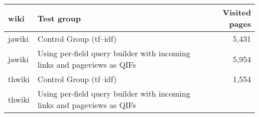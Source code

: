 \documentclass[12pt,]{article}
\begin{document}
\begin{longtable}[]{@{}llr@{}}
\toprule
\begin{minipage}[b]{0.10\columnwidth}\raggedright\strut
wiki\strut
\end{minipage} & \begin{minipage}[b]{0.67\columnwidth}\raggedright\strut
Test group\strut
\end{minipage} & \begin{minipage}[b]{0.14\columnwidth}\raggedleft\strut
Visited pages\strut
\end{minipage}\tabularnewline
\midrule
\endhead
\begin{minipage}[t]{0.10\columnwidth}\raggedright\strut
jawiki\strut
\end{minipage} & \begin{minipage}[t]{0.67\columnwidth}\raggedright\strut
Control Group (tf--idf)\strut
\end{minipage} & \begin{minipage}[t]{0.14\columnwidth}\raggedleft\strut
5,431\strut
\end{minipage}\tabularnewline
\begin{minipage}[t]{0.10\columnwidth}\raggedright\strut
jawiki\strut
\end{minipage} & \begin{minipage}[t]{0.67\columnwidth}\raggedright\strut
Using per-field query builder with incoming links and pageviews as
QIFs\strut
\end{minipage} & \begin{minipage}[t]{0.14\columnwidth}\raggedleft\strut
5,954\strut
\end{minipage}\tabularnewline
\begin{minipage}[t]{0.10\columnwidth}\raggedright\strut
thwiki\strut
\end{minipage} & \begin{minipage}[t]{0.67\columnwidth}\raggedright\strut
Control Group (tf--idf)\strut
\end{minipage} & \begin{minipage}[t]{0.14\columnwidth}\raggedleft\strut
1,554\strut
\end{minipage}\tabularnewline
\begin{minipage}[t]{0.10\columnwidth}\raggedright\strut
thwiki\strut
\end{minipage} & \begin{minipage}[t]{0.67\columnwidth}\raggedright\strut
Using per-field query builder with incoming links and pageviews as
QIFs\strut
\end{minipage} & \begin{minipage}[t]{0.14\columnwidth}\raggedleft\strut

\end{minipage}
\end{longtable}
\end{document}
